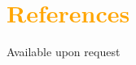 \documentclass[letterpaper,11pt]{article}
\begin{document}
\section{\textcolor{Orange}{References}}
\hspace*{2em}Available upon request

\end{document}
